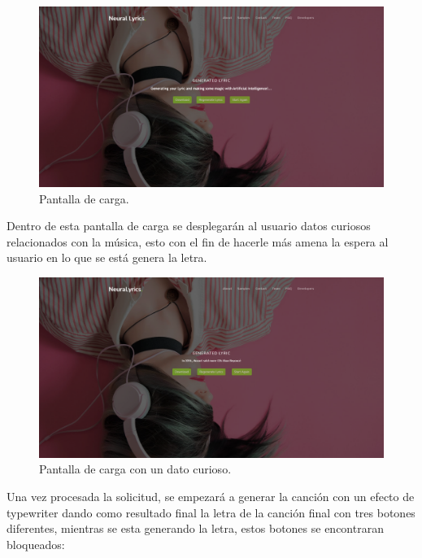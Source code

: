 \documentclass[12pt, a4paper, titlepage]{article}
\begin{document}
	\begin{figure}[H] 
		\includegraphics[width=13.5cm]{./Imagenes/Capturas/pgenerating.png}
		\centering \caption{Pantalla de carga.}
	\end{figure}
	Dentro de esta pantalla de carga se desplegarán al usuario datos curiosos relacionados con la música, esto con el fin de hacerle más amena la espera al usuario en lo que se está genera la letra.
	\begin{figure}[H] 
		\includegraphics[width=13.5cm]{./Imagenes/Capturas/ffact.png}
		\centering \caption{Pantalla de carga con un dato curioso.}
	\end{figure}
	Una vez procesada la solicitud, se empezará a generar la canción con un efecto de typewriter dando como resultado final la letra de la canción final con tres botones diferentes, mientras se esta generando la letra, estos botones se encontraran bloqueados:
\end{document}
